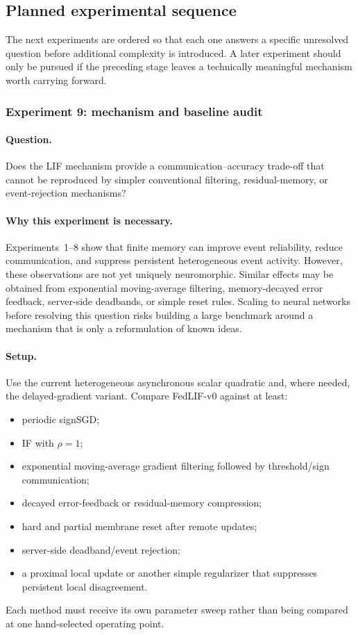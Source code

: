 \subsection{Planned experimental sequence}

The next experiments are ordered so that each one answers a specific unresolved question before additional complexity is introduced. A later experiment should only be pursued if the preceding stage leaves a technically meaningful mechanism worth carrying forward.

\subsubsection{Experiment 9: mechanism and baseline audit}

\paragraph{Question.}
Does the LIF mechanism provide a communication--accuracy trade-off that cannot be reproduced by simpler conventional filtering, residual-memory, or event-rejection mechanisms?

\paragraph{Why this experiment is necessary.}
Experiments~1--8 show that finite memory can improve event reliability, reduce communication, and suppress persistent heterogeneous event activity. However, these observations are not yet uniquely neuromorphic. Similar effects may be obtained from exponential moving-average filtering, memory-decayed error feedback, server-side deadbands, or simple reset rules. Scaling to neural networks before resolving this question risks building a large benchmark around a mechanism that is only a reformulation of known ideas.

\paragraph{Setup.}
Use the current heterogeneous asynchronous scalar quadratic and, where needed, the delayed-gradient variant. Compare FedLIF-v0 against at least:
\begin{itemize}
  \item periodic signSGD;
  \item IF with $\rho=1$;
  \item exponential moving-average gradient filtering followed by threshold/sign communication;
  \item decayed error-feedback or residual-memory compression;
  \item hard and partial membrane reset after remote updates;
  \item server-side deadband/event rejection;
  \item a proximal local update or another simple regularizer that suppresses persistent local disagreement.
\end{itemize}
Each method must receive its own parameter sweep rather than being compared at one hand-selected operating point.

